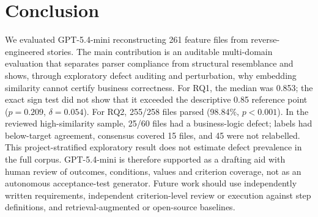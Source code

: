 \section{Conclusion}
\label{sec:conclusion}

We evaluated GPT-5.4-mini reconstructing 261 feature files from reverse-engineered stories. The main contribution is an auditable multi-domain evaluation that separates parser compliance from structural resemblance and shows, through exploratory defect auditing and perturbation, why embedding similarity cannot certify business correctness. For RQ1, the median was 0.853; the exact sign test did not show that it exceeded the descriptive 0.85 reference point ($p=0.209$, $\delta=0.054$). For RQ2, 255/258 files parsed (98.84\%, $p<0.001$). In the reviewed high-similarity sample, 25/60 files had a business-logic defect; labels had below-target agreement, consensus covered 15 files, and 45 were not relabelled. This project-stratified exploratory result does not estimate defect prevalence in the full corpus. GPT-5.4-mini is therefore supported as a drafting aid with human review of outcomes, conditions, values and criterion coverage, not as an autonomous acceptance-test generator. Future work should use independently written requirements, independent criterion-level review or execution against step definitions, and retrieval-augmented or open-source baselines.
